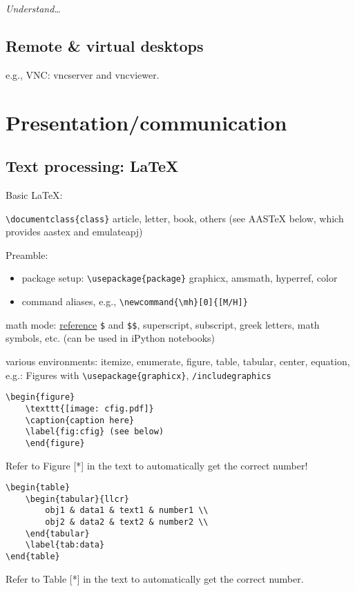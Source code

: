 \documentclass{article}
\newcommand{\test}[1]{%
    \begin{center}
        \colorbox{hl}{\parbox{0.9\textwidth}{\emph{#1}}}
    \end{center}}
\begin{document}
\test{Understand\ldots}

\subsection{Remote \& virtual desktops}
e.g., VNC: vncserver and vncviewer.

\section{Presentation/communication}
\subsection{Text processing: LaTeX}

Basic LaTeX:

\verb|\documentclass{class}| article, letter, book, others (see AASTeX
below, which provides aastex and emulateapj)

Preamble:
\begin{itemize}
    \item package setup: \verb|\usepackage{package}|
        graphicx, amsmath, hyperref, color
    \item command aliases, e.g., \verb|\newcommand{\mh}[0]{[M/H]}|
\end{itemize}
math mode:
\href{https://www.sharelatex.com/learn/Mathematical_expressions}{reference}
\verb|$| and \verb|$$|, superscript, subscript, greek
letters, math symbols, etc. (can be used in iPython notebooks)

various environments: itemize, enumerate, figure, table, tabular,
center, equation, e.g.:
Figures with \verb|\usepackage{graphicx}|, \verb|/includegraphics|
\begin{verbatim}
\begin{figure}
    \texttt{[image: cfig.pdf]}
    \caption{caption here}
    \label{fig:cfig} (see below)
    \end{figure}
\end{verbatim}
Refer to Figure [*] in the text to automatically get the correct
number!
\begin{verbatim}
\begin{table}
    \begin{tabular}{llcr}
        obj1 & data1 & text1 & number1 \\
        obj2 & data2 & text2 & number2 \\
    \end{tabular}
    \label{tab:data}
\end{table}
\end{verbatim}
Refer to Table [*] in the text to automatically get the
correct number.
\end{document}
